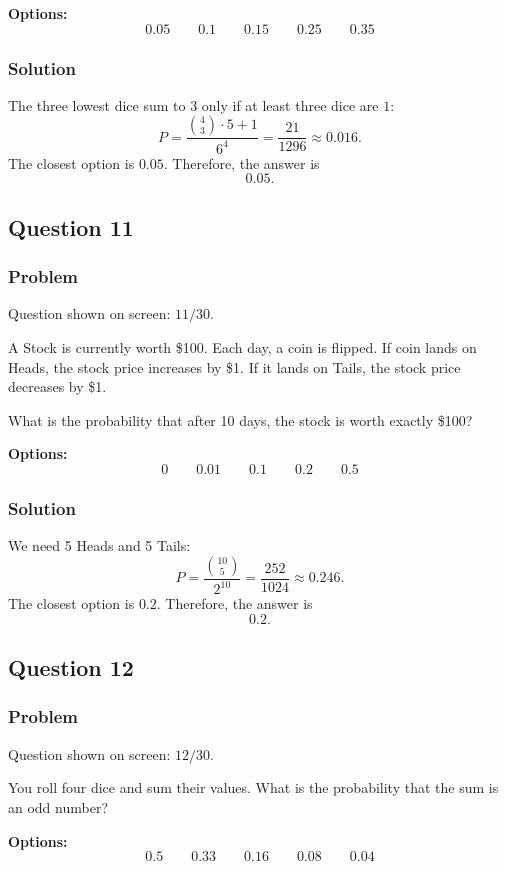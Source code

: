 \documentclass[12pt]{article}
\begin{document}
\noindent\textbf{Options:}
\[
\boxed{0.05}
\qquad
\boxed{0.1}
\qquad
\boxed{0.15}
\qquad
\boxed{0.25}
\qquad
\boxed{0.35}
\]

\subsubsection{Solution}
The three lowest dice sum to \(3\) only if at least three dice are \(1\):
\[
P=\frac{\binom{4}{3}\cdot 5+1}{6^4}
=\frac{21}{1296}\approx 0.016.
\]
The closest option is \(0.05\). Therefore, the answer is
\[
\boxed{0.05}.
\]

\subsection{Question 11}
\subsubsection{Problem}
Question shown on screen: \(11/30\).

A Stock is currently worth \$100. Each day, a coin is flipped. If coin lands on Heads, the stock price increases by \$1. If it lands on Tails, the stock price decreases by \$1.

What is the probability that after 10 days, the stock is worth exactly \$100?

\noindent\textbf{Options:}
\[
\boxed{0}
\qquad
\boxed{0.01}
\qquad
\boxed{0.1}
\qquad
\boxed{0.2}
\qquad
\boxed{0.5}
\]

\subsubsection{Solution}
We need 5 Heads and 5 Tails:
\[
P=\frac{\binom{10}{5}}{2^{10}}
=\frac{252}{1024}\approx 0.246.
\]
The closest option is \(0.2\). Therefore, the answer is
\[
\boxed{0.2}.
\]

\subsection{Question 12}
\subsubsection{Problem}
Question shown on screen: \(12/30\).

You roll four dice and sum their values. What is the probability that the sum is an odd number?

\noindent\textbf{Options:}
\[
\boxed{0.5}
\qquad
\boxed{0.33}
\qquad
\boxed{0.16}
\qquad
\boxed{0.08}
\qquad
\boxed{0.04}
\]
\end{document}
